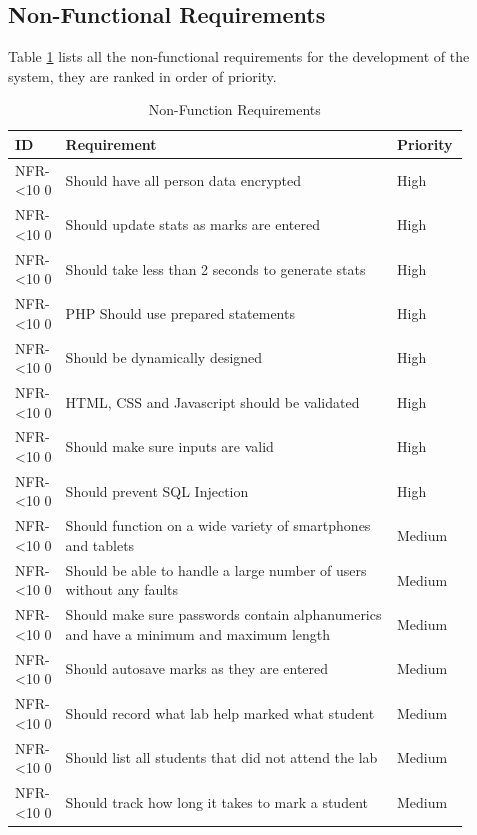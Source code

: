 \documentclass[12pt]{article}  %
\newcommand{\rid}[1]{\centering #1-\ifnum\value{requirement}<10 0\fi\arabic{requirement} \stepcounter{requirement}}
\begin{document}
\begin{spacing}{1.5}
\begin{longtable}{|p{0.09\linewidth}|p{0.6\linewidth}|p{0.1\linewidth}|
p{0.1\linewidth}|}
\end{longtable}
\end{spacing}
\setcounter{requirement}{1}


\newpage
\subsection{Non-Functional Requirements}

Table \ref{table:non-func} lists all the non-functional requirements for the development of the system, they are ranked in order of priority.

\begin{spacing}{1.5}
\begin{longtable}{|p{0.1\linewidth}|p{0.7\linewidth}|p{0.1\linewidth}|}
\caption{Non-Function Requirements} \label{table:non-func}\\
\hline
\textbf{ID} & \textbf{Requirement} & \textbf{Priority}\\
\hline \hline

\rid{NFR} & Should have all person data encrypted & High\\ \hline
\rid{NFR} & Should update stats as marks are entered & High\\ \hline
\rid{NFR} & Should take less than 2 seconds to generate stats  & High\\ \hline
\rid{NFR} & PHP Should use prepared statements & High\\ \hline
\rid{NFR} & Should be dynamically designed & High\\ \hline
\rid{NFR} & HTML, CSS and Javascript should be validated & High\\ \hline
\rid{NFR} & Should make sure inputs are valid & High\\ \hline
\rid{NFR} & Should prevent SQL Injection & High\\ \hline

\rid{NFR} & Should function on a wide variety of smartphones and tablets & Medium\\ \hline
\rid{NFR} & Should be able to handle a large number of users without any faults & Medium\\ \hline
\rid{NFR} & Should make sure passwords contain alphanumerics and have a minimum and maximum length  & Medium\\ \hline
\rid{NFR} & Should autosave marks as they are entered & Medium\\ \hline
\rid{NFR} & Should record what lab help marked what student & Medium\\ \hline
\rid{NFR} & Should list all students that did not attend the lab & Medium\\ \hline
\rid{NFR} & Should track how long it takes to mark a student & Medium \\ \hline


\end{longtable}
\end{spacing}
\end{document}
